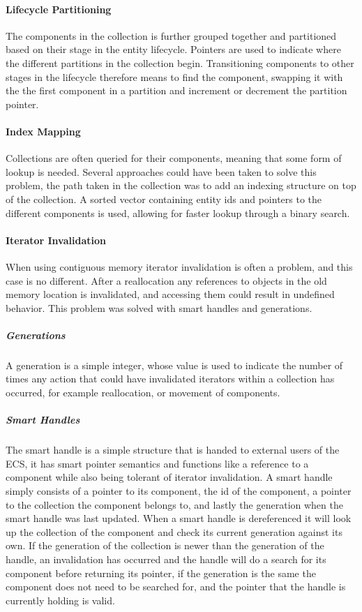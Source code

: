 \paragraph{Lifecycle Partitioning}
The components in the collection is further grouped together and partitioned based on their stage
in the entity lifecycle.
Pointers are used to indicate where the different partitions in the collection begin.
Transitioning components to other stages in the lifecycle therefore means to find the component,
swapping it with the the first component in a partition and increment or decrement the partition pointer.

\paragraph{Index Mapping}
Collections are often queried for their components, meaning that some form of lookup is needed.
Several approaches could have been taken to solve this problem,
the path taken in the collection was to add an indexing structure on top of the collection.
A sorted vector containing entity ids and pointers to the different components is used,
allowing for faster lookup through a binary search.

\paragraph{Iterator Invalidation}
When using contiguous memory iterator invalidation is often a problem, and this case is no different.
After a reallocation any references to objects in the old memory location is invalidated,
and accessing them could result in undefined behavior.
This problem was solved with smart handles and generations.

\subparagraph{Generations}
A generation is a simple integer, whose value is used to indicate the number of times any action that
could have invalidated iterators within a collection has occurred, for example reallocation,
or movement of components.

\subparagraph{Smart Handles}
The smart handle is a simple structure that is handed to external users of the ECS,
it has smart pointer semantics and functions like a reference to a component while also being tolerant of iterator invalidation.
A smart handle simply consists of a pointer to its component, the id of the component,
a pointer to the collection the component belongs to, and lastly the generation when the smart handle was last updated.
When a smart handle is dereferenced it will look up the collection of the component and check its current generation
against its own. If the generation of the collection is newer than the generation of the handle,
an invalidation has occurred and the handle will do a search for its component before returning its pointer,
if the generation is the same the component does not need to be searched for, and the pointer that the handle is currently holding is valid.

